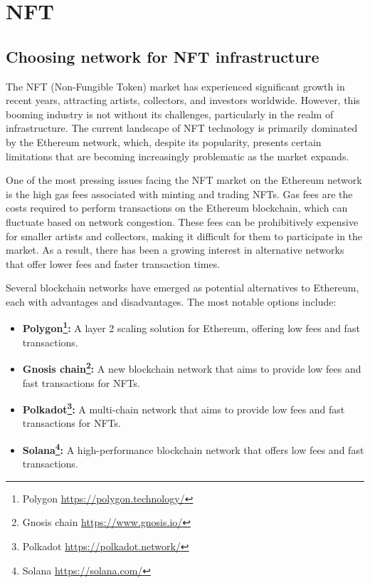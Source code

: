 \section{NFT}
\subsection{Choosing network for NFT infrastructure}
The NFT (Non-Fungible Token) market has experienced significant growth in recent years, attracting artists, collectors, and investors worldwide. However, this booming industry is not without its challenges, particularly in the realm of infrastructure. The current landscape of NFT technology is primarily dominated by the Ethereum network, which, despite its popularity, presents certain limitations that are becoming increasingly problematic as the market expands.

One of the most pressing issues facing the NFT market on the Ethereum network is the high gas fees associated with minting and trading NFTs. Gas fees are the costs required to perform transactions on the Ethereum blockchain, which can fluctuate based on network congestion. These fees can be prohibitively expensive for smaller artists and collectors, making it difficult for them to participate in the market. As a result, there has been a growing interest in alternative networks that offer lower fees and faster transaction times.

Several blockchain networks have emerged as potential alternatives to Ethereum, each with advantages and disadvantages. The most notable options include:

\begin{itemize}
    \item \textbf{Polygon\footnote{Polygon \url{https://polygon.technology/}}:} A layer 2 scaling solution for Ethereum, offering low fees and fast transactions.
    \item \textbf{Gnosis chain\footnote{Gnosis chain \url{https://www.gnosis.io/}}:} A new blockchain network that aims to provide low fees and fast transactions for NFTs.
    \item \textbf{Polkadot\footnote{Polkadot \url{https://polkadot.network/}}:} A multi-chain network that aims to provide low fees and fast transactions for NFTs.
    \item \textbf{Solana\footnote{Solana \url{https://solana.com/}}:} A high-performance blockchain network that offers low fees and fast transactions.
\end{itemize}

